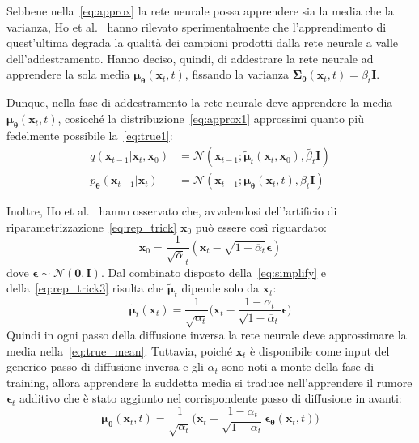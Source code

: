 \medskip
\noindent Sebbene nella~\eqref{eq:approx} la rete neurale possa apprendere sia la media che la varianza, Ho et al.~\cite{ho2020} hanno rilevato sperimentalmente
che l'apprendimento di quest'ultima degrada la qualità dei campioni prodotti dalla rete neurale a valle dell'addestramento.
Hanno deciso, quindi, di addestrare la rete neurale ad apprendere la sola media $\bm{\mu}_{\bm{\theta}}(\mathbf{x}_t,t)$, 
fissando la varianza $\bm{\Sigma}_{\bm{\theta}}(\mathbf{x}_t,t)=\beta_t\bm{I}$. 

Dunque, nella fase di addestramento la rete neurale deve apprendere la media $\bm{\mu}_{\bm{\theta}}(\mathbf{x}_t,t)$, cosicché 
la distribuzione~\eqref{eq:approx1} approssimi quanto più fedelmente possibile la~\eqref{eq:true1}:
\begin{align}
    q(\mathbf{x}_{t-1}|\mathbf{x}_t,\mathbf{x}_0) &= \mathcal{N}(\mathbf{x}_{t-1}; \tilde{\bm{\mu}}_{t}(\mathbf{x}_t,\mathbf{x}_0),\tilde{\beta_t} \bm{I})\label{eq:true1} \\
    p_{\bm{\theta}}(\mathbf{x}_{t-1}|\mathbf{x}_t)&=\mathcal{N}(\mathbf{x}_{t-1};\bm{\mu}_{\bm{\theta}}(\mathbf{x}_t,t),\beta_t\bm{I})\label{eq:approx1}
\end{align}

\noindent Inoltre, Ho et al.~\cite{ho2020} hanno osservato che, avvalendosi dell'artificio di riparametrizzazione~\eqref{eq:rep_trick} $\mathbf{x}_0$ può essere così riguardato:
\begin{equation}
  \mathbf{x}_0=\frac{1}{\sqrt{\overline{\alpha}}_t}(\mathbf{x}_t-\sqrt{1-\overline{\alpha}_t}\bm{\epsilon}) \label{eq:rep_trick3}
\end{equation}
dove $\bm{\epsilon}\sim\mathcal{N}(\bm{0},\bm{I})$.
Dal combinato disposto della~\eqref{eq:simplify} e della~\eqref{eq:rep_trick3} risulta che 
$\tilde{\bm{\mu}}_t$ dipende solo da $\mathbf{x}_t$:
\begin{equation}
    \tilde{\bm{\mu}}_t(\mathbf{x}_t)=\frac{1}{\sqrt{\alpha_t}}\biggl(\mathbf{x}_t-\frac{1-\alpha_t}{\sqrt{1-\overline{\alpha}_t}}\bm{\epsilon}\biggr) \label{eq:true_mean}
\end{equation}
Quindi in ogni passo della diffusione inversa la rete neurale deve approssimare la media nella~\eqref{eq:true_mean}. 
Tuttavia, poiché $\mathbf{x}_t$ è disponibile come input del generico passo di diffusione inversa e gli $\alpha_t$ sono noti a monte della fase di training,
allora apprendere la suddetta media si traduce nell'apprendere il rumore $\bm{\epsilon}_t$ additivo che è stato aggiunto nel corrispondente passo di diffusione in avanti:
\begin{equation}
    \bm{\mu}_{\bm{\theta}}(\mathbf{x}_t,t)=\frac{1}{\sqrt{\alpha_t}}\biggl(\mathbf{x}_t-\frac{1-\alpha_t}{\sqrt{1-\overline{\alpha}_t}}\bm{\epsilon}_{\bm{\theta}}(\mathbf{x}_t,t)\biggr) \label{eq:learned_mean}
\end{equation}

